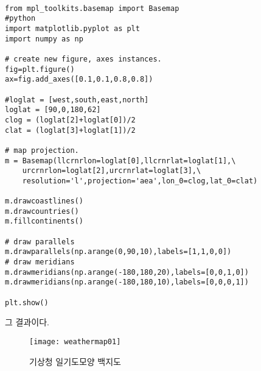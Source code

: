 \begin{code}
	\begin{lstlisting}
	
from mpl_toolkits.basemap import Basemap
#python 
import matplotlib.pyplot as plt
import numpy as np

# create new figure, axes instances.
fig=plt.figure()
ax=fig.add_axes([0.1,0.1,0.8,0.8])

#loglat = [west,south,east,north]
loglat = [90,0,180,62]
clog = (loglat[2]+loglat[0])/2
clat = (loglat[3]+loglat[1])/2

# map projection.
m = Basemap(llcrnrlon=loglat[0],llcrnrlat=loglat[1],\
	urcrnrlon=loglat[2],urcrnrlat=loglat[3],\
	resolution='l',projection='aea',lon_0=clog,lat_0=clat)

m.drawcoastlines()
m.drawcountries()
m.fillcontinents()

# draw parallels
m.drawparallels(np.arange(0,90,10),labels=[1,1,0,0])
# draw meridians
m.drawmeridians(np.arange(-180,180,20),labels=[0,0,1,0])
m.drawmeridians(np.arange(-180,180,10),labels=[0,0,0,1])

plt.show()	
	\end{lstlisting}
\end{code}

그 결과이다. 

\begin{figure}[h]
	\centering
	\texttt{[image: weathermap01]}
	\caption{기상청 일기도모양 백지도}
	\label{fig:weathermap01}
\end{figure}